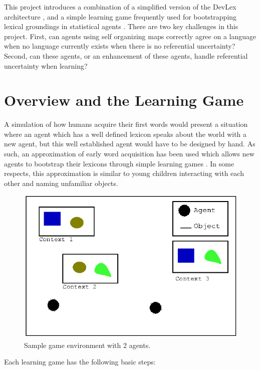 \documentclass[a4paper,11pt]{article}
\begin{document}
This project introduces a combination of a simplified version of the DevLex
architecture \cite{LiDevLex}, and a simple learning game frequently used for
bootstrapping lexical groundings in statistical agents
\cite{VogtLearningSim,VogtSocial}.  There are two key challenges in this
project.  First, can agents using self organizing maps correctly agree on a
language when no language currently exists when there is no referential
uncertainty?  Second, can these agents, or an enhancement of these agents,
handle referential uncertainty when learning?

\section{Overview and the Learning Game}
A simulation of how humans acquire their first words would present a situation
where an agent which has a well defined lexicon speaks about the world with a
new agent, but this well established agent would have to be designed by hand.
As such, an approximation of early word acquisition has been used which allows
new agents to bootstrap their lexicons through simple learning games
\cite{VogtLearningSim,VogtSocial}.  In some respects, this approximation is
similar to young children interacting with each other and naming unfamiliar
objects. 

\begin{figure} \center \includegraphics[width=.49\textwidth]{game-env.eps}
\caption{Sample game environment with 2 agents.} \label{fig:game-env}
\end{figure}

Each learning game has the following basic steps:
\end{document}

